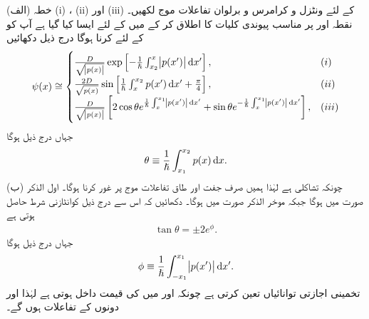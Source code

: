 (الف) خطہ (i) ، (ii)  اور (iii)  کے لئے  ونٹزل و کرامرس و برلوان تفاعلات موج لکھیں۔ نقطہ  اور  پر مناسب پیوندی کلیات کا اطلاق کر کے  میں  کے لئے ایسا کیا گیا ہے آپ کو  کے لئے کرنا ہوگا درج ذیل دکھائیں
\begin{align*}
	\psi(x)\cong
	\begin{cases}
		\frac{D}{\sqrt{\abs{p(x)}}} \exp\left[-\frac{1}{\hslash}\int^{x}_{x_{2}}\abs{p(x')}\dif x'\right],& (i) \\
		\frac{2D}{\sqrt{p(x)}} \sin\left[\frac{1}{\hslash}\int^{x_{2}}_{x}p(x')\dif x'+\frac{\pi}{4}\right],& (ii) \\
		\frac{D}{\sqrt{\abs{p(x)}}}\left[2 \cos\theta e^{\frac{1}{\hslash}\int^{x_{1}}_{x}\abs{p(x')}\dif x'} +\sin\theta e^{-\frac{1}{\hslash}\int^{x_{1}}_{x}\abs{p(x')}\dif x'}\right],& (iii)
	\end{cases}
\end{align*}
جہاں درج ذیل ہوگا
\begin{align}
	\theta\equiv\frac{1}{\hslash}\int^{x_{2}}_{x_{1}}p(x)\dif  x.
\end{align}
(ب) چونکہ  تشاکلی ہے لہٰذا ہمیں صرف جفت  اور طاق  تفاعلات موج پر غور کرنا ہوگا۔ اول الذکر صورت میں  ہوگا جبکہ موخر الذکر صورت میں  ہوگا۔ دکھائیں کہ اس سے درج ذیل کوانٹازنی شرط حاصل ہوتی ہے
\begin{align}
	\tan\theta=\pm 2e^{\phi}.
\end{align}
جہاں درج ذیل ہوگا
\begin{align}
	\phi\equiv\frac{1}{\hslash}\int^{x_{1}}_{-x_{1}}\abs{p(x')}\dif x'.
\end{align}
 تخمینی اجازتی توانائیاں تعین کرتی ہے چونکہ  اور  میں  کی قیمت داخل ہوتی ہے لہٰذا  اور  دونوں  کے تفاعلات ہوں گے۔

